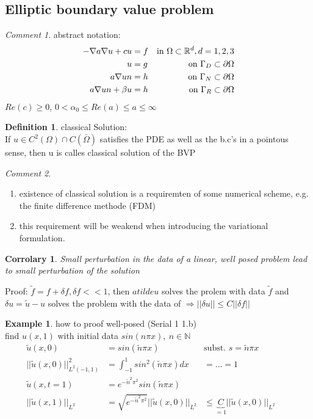 \documentclass[ngerman]{article}
\newtheorem*{corr}{Corrolary}
\theoremstyle{definition}
\newtheorem*{defi}{Definition}
\newtheorem*{exa}{Example}
\theoremstyle{remark}
\newtheorem*{comm}{Comment}
\newcommand{\p}{\partial}
\newcommand{\NN}{\mathbb{N}}			%
\newcommand{\RR}{\mathbb{R}}			%
\renewcommand{\aa}{\alpha}		%
\newcommand{\bb}{\beta}					%
\newcommand{\OO}{\Omega}
\newcommand{\drw}{\Rightarrow}			%
\newcommand{\tx}[1]{\text{#1}}
\begin{document}
\subsection{Elliptic boundary value problem}
\begin{comm}abstract notation:\\
  \begin{align*}
    -\nabla a \nabla u + c u &= f& \tx{in } \OO\subset\RR^d,d=1,2,3\\
    u&=g & \tx{on }\GG_D \subset \p \OO\\
    a\nabla u n&=h &\tx{on } \GG_N \subset \p \OO \\
    a \nabla u n + \bb u &= h & \tx{on }\GG_{R}\subset \p \OO
  \end{align*}
  $Re(c)\geq 0$, $0<\aa_0\leq Re(a) \leq a \leq \infty$\end{comm}
\begin{defi}classical Solution:\\
  If $u \in C^2(\OO)\cap C(\bar\OO)$ satisfies the PDE as well as the b.c's in a pointous sense, then u is calles classical solution of the BVP
\end{defi}
\begin{comm}
  \begin{enumerate}
  \item existence of classical solution is a requiremten of some numerical scheme, e.g. the finite difference methode (FDM)
  \item this requirement will be weakend when introducing the variational formulation.
  \end{enumerate}
\end{comm}
\begin{corr}
  Small perturbation in the data of a linear, well posed problem lead to small perturbation of the solution
\end{corr}
Proof: $\tilde f = f + \delta f , \delta f <<1$, then $atilde u$ solves the prolem with data $\tilde f$ and $\delta u = \tilde u - u$ solves the problem with the data of $\drw ||\delta u || \leq C||\delta f||$

\begin{exa} how to proof well-posed (Serial 1 1.b)\\
  find $u(x,1) $ with initial data $sin(n\pi x) ,\ n \in \NN$
  \begin{align*}
    \tilde u (x,0) &= sin(\tilde n \pi x)& \tx{subst. } s=\tilde n \pi x\\
    ||\tilde u (x,0)||^2_{L^2(-1,1)} &= \int^1_{-1}sin^2(\tilde n \pi x) dx &=... = 1\\
    \tilde u (x,t=1) &= e^{-\tilde n^2\pi^2}sin(\tilde n \pi x)\\
    ||\tilde u (x,1)||_{L^2}&= \sqrt{e^{-\tilde n ^2 \pi^2}}||\tilde u(x,0)||_{L^2} 
    &\leq \underbrace{C}_{=1} ||\tilde u (x,0)||_{L^2} &\quad
  \end{align*}
\end{exa}
\end{document}
